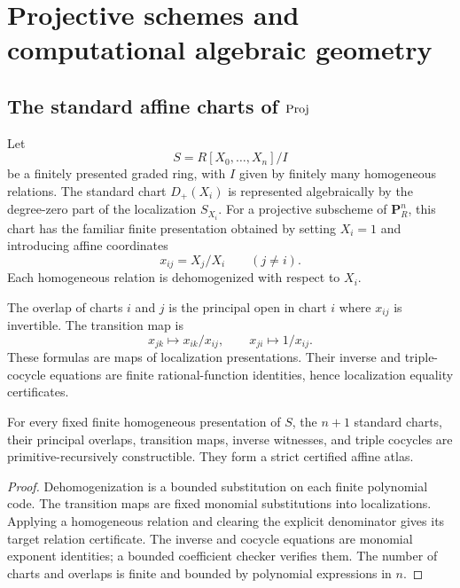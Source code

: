 \section{Projective schemes and computational algebraic geometry}

\subsection{The standard affine charts of \texorpdfstring{$\operatorname{Proj}$}{Proj}}

Let
\[
 S=R[X_0,\ldots,X_n]/I
\]
be a finitely presented graded ring, with $I$ given by finitely many homogeneous relations.  The
standard chart $D_+(X_i)$ is represented algebraically by the degree-zero part of the localization
$S_{X_i}$.  For a projective subscheme of $\mathbf P^n_R$, this chart has the familiar finite
presentation obtained by setting $X_i=1$ and introducing affine coordinates
\[
                    x_{ij}=X_j/X_i\qquad(j\neq i).
\]
Each homogeneous relation is dehomogenized with respect to $X_i$.

The overlap of charts $i$ and $j$ is the principal open in chart $i$ where $x_{ij}$ is invertible.
The transition map is
\[
 x_{jk}\longmapsto x_{ik}/x_{ij},
 \qquad
 x_{ji}\longmapsto 1/x_{ij}.
\]
These formulas are maps of localization presentations.  Their inverse and triple-cocycle equations
are finite rational-function identities, hence localization equality certificates.

\begin{proposition}\label{prop:proj-atlas}
For every fixed finite homogeneous presentation of $S$, the $n+1$ standard charts, their principal
overlaps, transition maps, inverse witnesses, and triple cocycles are primitive-recursively
constructible.  They form a strict certified affine atlas.
\end{proposition}

\begin{proof}
Dehomogenization is a bounded substitution on each finite polynomial code.  The transition maps are
fixed monomial substitutions into localizations.  Applying a homogeneous relation and clearing the
explicit denominator gives its target relation certificate.  The inverse and cocycle equations are
monomial exponent identities; a bounded coefficient checker verifies them.  The number of charts
and overlaps is finite and bounded by polynomial expressions in $n$.
\end{proof}

